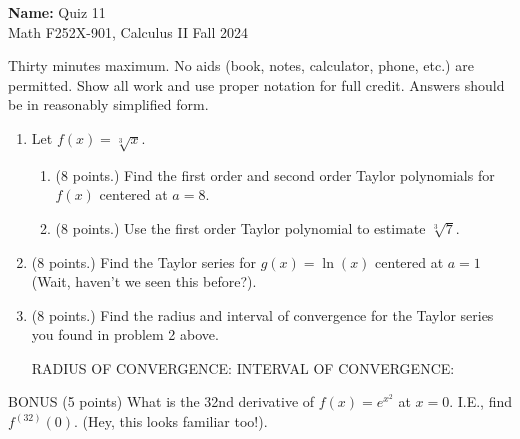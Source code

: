 \documentclass[12pt]{article}
\newcommand{\ds}{\displaystyle}
\newcommand{\points}[1]{(#1 points.)}		%
\begin{document}
\pagestyle{plain}

\noindent \textbf{Name:} \underline{\hspace{15em}}		\hfill	Quiz 11 \\
           Math F252X-901, Calculus II  			\hfill	Fall 2024 	

                \vspace{1cm}
                
Thirty minutes maximum. No aids (book, notes,
calculator, phone, etc.) are permitted. Show all work and use proper
notation for full credit. Answers should be in reasonably simplified
form.

\begin{enumerate}

\item Let $\ds f(x) = \sqrt[3]{x}$.
  \begin{enumerate}
  \item \points{8} Find the first order and second order Taylor polynomials for
    $f(x)$ centered at $a=8$.
    \vfill

  \item \points{8} Use the first order Taylor polynomial to estimate $\ds \sqrt[3]{7}$.
    \vfill
  \end{enumerate}

  \newpage

\item \points{8} Find the Taylor series for $\ds g(x) = \ln(x)$ centered at $a=1$
  (Wait, haven't we seen this before?).

  \vfill

\item \points{8} Find the radius and interval of convergence for the Taylor
  series you found in problem 2 above.

  \vfill

  RADIUS OF CONVERGENCE:\underline{\hspace{2cm}} INTERVAL OF CONVERGENCE:\underline{\hspace{2cm}} 
  
\end{enumerate}

\newpage

BONUS (5 points) What is the 32nd derivative of $\ds f(x) = e^{x^2}$
at $x=0$. I.E., find $f^{(32)}(0)$.
(Hey, this looks familiar too!).
\end{document}
